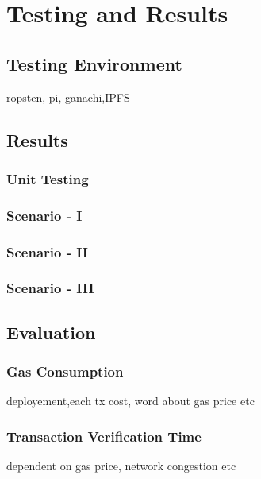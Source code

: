 \section{Testing and Results}
\subsection{Testing Environment}
ropsten, pi, ganachi,IPFS
\subsection{Results}
\subsubsection{Unit Testing}
\subsubsection{Scenario - I}
\subsubsection{Scenario - II}
\subsubsection{Scenario - III}
\subsection{Evaluation}
\subsubsection{Gas Consumption}
deployement,each tx cost, word about gas price etc
\subsubsection{Transaction Verification Time}
dependent on gas price, network congestion etc